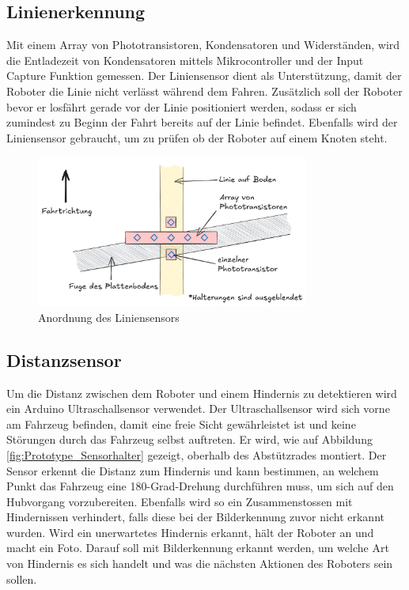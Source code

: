 \subsection{Linienerkennung}

Mit einem Array von Phototransistoren, Kondensatoren und Widerständen, wird die Entladezeit von Kondensatoren mittels Mikrocontroller und der Input Capture Funktion gemessen. Der Liniensensor dient als Unterstützung, damit der Roboter die Linie nicht verlässt während dem Fahren. Zusätzlich soll der Roboter bevor er losfährt gerade vor der Linie positioniert werden, sodass er sich zumindest zu Beginn der Fahrt bereits auf der Linie befindet. Ebenfalls wird der Liniensensor gebraucht, um zu prüfen ob der Roboter auf einem Knoten steht.

\begin{figure}[H]
\centering
\includegraphics[width=0.8\textwidth]{img/linesensor_on_line.png}
\caption{Anordnung des Liniensensors}
\label{fig:liniensensor-konzept}
\end{figure}

\subsection{Distanzsensor}
\label{subsection:Distanzsensor}

Um die Distanz zwischen dem Roboter und einem Hindernis zu detektieren wird ein Arduino Ultraschallsensor verwendet. Der Ultraschallsensor wird sich vorne am Fahrzeug befinden, damit eine freie Sicht gewährleistet ist und keine Störungen durch das Fahrzeug selbst auftreten. Er wird, wie auf Abbildung \ref{fig:Prototype_Sensorhalter} gezeigt, oberhalb des Abstützrades montiert. Der Sensor erkennt die Distanz zum Hindernis und kann bestimmen, an welchem Punkt das Fahrzeug eine 180-Grad-Drehung durchführen muss, um sich auf den Hubvorgang vorzubereiten. Ebenfalls wird so ein Zusammenstossen mit Hindernissen verhindert, falls diese bei der Bilderkennung zuvor nicht erkannt wurden. Wird ein unerwartetes Hindernis erkannt, hält der Roboter an und macht ein Foto. Darauf soll mit Bilderkennung erkannt werden, um welche Art von Hindernis es sich handelt und was die nächsten Aktionen des Roboters sein sollen.

